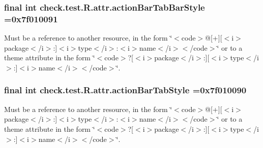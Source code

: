 \subsubsection[{action\+Bar\+Tab\+Bar\+Style}]{\setlength{\rightskip}{0pt plus 5cm}final int check.\+test.\+R.\+attr.\+action\+Bar\+Tab\+Bar\+Style =0x7f010091\hspace{0.3cm}{\ttfamily [static]}}\label{classcheck_1_1test_1_1_r_1_1attr_a87898eccbaa7fa385bf19395d0a5b922}
Must be a reference to another resource, in the form \char`\"{}$<$code$>$@\mbox{[}+\mbox{]}\mbox{[}$<$i$>$package$<$/i$>$\+:\mbox{]}$<$i$>$type$<$/i$>$\+:$<$i$>$name$<$/i$>$$<$/code$>$\char`\"{} or to a theme attribute in the form \char`\"{}$<$code$>$?\mbox{[}$<$i$>$package$<$/i$>$\+:\mbox{]}\mbox{[}$<$i$>$type$<$/i$>$\+:\mbox{]}$<$i$>$name$<$/i$>$$<$/code$>$\char`\"{}. \hypertarget{classcheck_1_1test_1_1_r_1_1attr_af4b84f04cbf930199baf459bd577b438}{}
\subsubsection[{action\+Bar\+Tab\+Style}]{\setlength{\rightskip}{0pt plus 5cm}final int check.\+test.\+R.\+attr.\+action\+Bar\+Tab\+Style =0x7f010090\hspace{0.3cm}{\ttfamily [static]}}\label{classcheck_1_1test_1_1_r_1_1attr_af4b84f04cbf930199baf459bd577b438}
Must be a reference to another resource, in the form \char`\"{}$<$code$>$@\mbox{[}+\mbox{]}\mbox{[}$<$i$>$package$<$/i$>$\+:\mbox{]}$<$i$>$type$<$/i$>$\+:$<$i$>$name$<$/i$>$$<$/code$>$\char`\"{} or to a theme attribute in the form \char`\"{}$<$code$>$?\mbox{[}$<$i$>$package$<$/i$>$\+:\mbox{]}\mbox{[}$<$i$>$type$<$/i$>$\+:\mbox{]}$<$i$>$name$<$/i$>$$<$/code$>$\char`\"{}. \hypertarget{classcheck_1_1test_1_1_r_1_1attr_aff28ad7140f8babb08a120b09cb32cc9}{}

